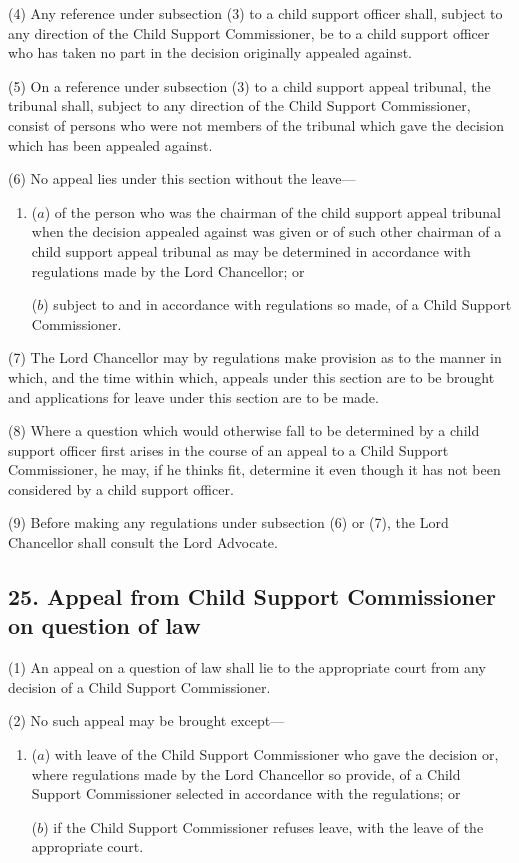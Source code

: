 \documentclass[12pt,a4paper]{article}
\begin{document}
(4) Any reference under subsection (3)  to a child support officer shall, subject to any direction of the Child Support Commissioner, be to a child support officer who has taken no part in the decision originally appealed against.

(5) On a reference under subsection (3)  to a child support appeal tribunal, the tribunal shall, subject to any direction of the Child Support Commissioner, consist of persons who were not members of the tribunal which gave the decision which has been appealed against.

(6) No appeal lies under this section without the leave—
\begin{enumerate}\item[]
($a$) of the person who was the chairman of the child support appeal tribunal when the decision appealed against was given or of such other chairman of a child support appeal tribunal as may be determined in accordance with regulations made by the Lord Chancellor; or

($b$) subject to and in accordance with regulations so made, of a Child Support Commissioner.
\end{enumerate}

(7) The Lord Chancellor may by regulations make provision as to the manner in which, and the time within which, appeals under this section are to be brought and applications for leave under this section are to be made.

(8) Where a question which would otherwise fall to be determined by a child support officer first arises in the course of an appeal to a Child Support Commissioner, he may, if he thinks fit, determine it even though it has not been considered by a child support officer.

(9) Before making any regulations under subsection (6)  or (7), the Lord Chancellor shall consult the Lord Advocate.


\subsection{25. Appeal from Child Support Commissioner on question of law}

(1) An appeal on a question of law shall lie to the appropriate court from any decision of a Child Support Commissioner.

(2) No such appeal may be brought except—
\begin{enumerate}\item[]
($a$) with leave of the Child Support Commissioner who gave the decision or, where regulations made by the Lord Chancellor so provide, of a Child Support Commissioner selected in accordance with the regulations; or

($b$) if the Child Support Commissioner refuses leave, with the leave of the appropriate court.
\end{enumerate}
\end{document}
